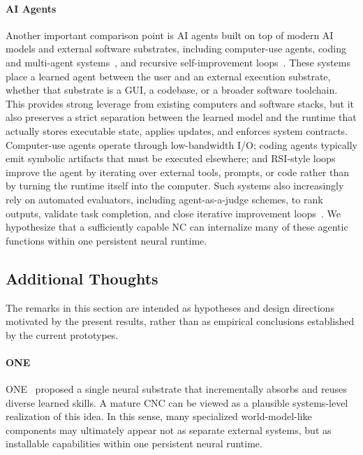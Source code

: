 \paragraph{AI Agents}
Another important comparison point is AI agents built on top of modern AI models and external software substrates, including computer-use agents, coding and multi-agent systems~\citep{openaiComputerUsingAgent,claudeComputerTool,hong2023metagpt,zhuge2024gptswarm_icml,sager2025comprehensivesurveyagentscomputer}, and recursive self-improvement loops~\citep{zhuge2026ai_recursive}. 
These systems place a learned agent between the user and an external execution substrate, whether that substrate is a GUI, a codebase, or a broader software toolchain.
This provides strong leverage from existing computers and software stacks, but it also preserves a strict separation between the learned model and the runtime that actually stores executable state, applies updates, and enforces system contracts.
Computer-use agents operate through low-bandwidth I/O; coding agents typically emit symbolic artifacts that must be executed elsewhere; and RSI-style loops improve the agent by iterating over external tools, prompts, or code rather than by turning the runtime itself into the computer.
Such systems also increasingly rely on automated evaluators, including agent-as-a-judge schemes, to rank outputs, validate task completion, and close iterative improvement loops~\citep{zhuge2024agent_judge}.
We hypothesize that a sufficiently capable NC can internalize many of these agentic functions within one persistent neural runtime.

\subsection{Additional Thoughts} %
The remarks in this section are intended as hypotheses and design directions motivated by the present results, rather than as empirical conclusions established by the current prototypes.

\paragraph{ONE}
ONE~\citep{schmidhuber2018one} proposed a single neural substrate that incrementally absorbs and reuses diverse learned skills. A mature CNC can be viewed as a plausible systems-level realization of this idea. In this sense, many specialized world-model-like components may ultimately appear not as separate external systems, but as installable capabilities within one persistent neural runtime.

